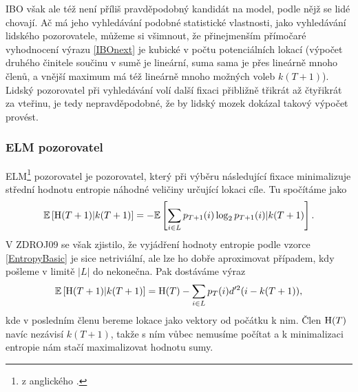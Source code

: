 IBO však ale též není příliš pravděpodobný  kandidát na model, podle nějž se
lidé chovají.  Ač má jeho vyhledávání podobné statistické vlastnosti, jako
vyhledávání lidského pozorovatele, můžeme si všimnout, že přinejmenším
přímočaré vyhodnocení výrazu \eqref{IBOnext} je kubické v počtu potenciálních
lokací (výpočet druhého činitele součinu v sumě je lineární, suma sama je přes
lineárně mnoho členů, a vnější maximum má též lineárně mnoho možných voleb
$k(T+1)$). Lidský pozorovatel při vyhledávání volí další fixaci přibližně
třikrát až čtyřikrát za vteřinu, je tedy nepravděpodobné, že by lidský mozek
dokázal takový výpočet provést. 

\subsubsection{ELM pozorovatel}

ELM\footnote{z anglického .} pozorovatel je
pozorovatel, který při výběru následující fixace minimalizuje střední hodnotu
entropie náhodné veličiny určující lokaci cíle. Tu spočítáme jako
\begin{equation}\label{EntropyBasic}\mathbb{E}\left[\operatorname{H}(T+1)|k(T+1)\right]=-\mathbb{E}\left[\displaystyle\sum_{i\in
L}p_{T+1}(i)\log_2p_{T+1}(i)|k(T+1)\right].\end{equation} V ZDROJ09 se však zjistilo,
že vyjádření hodnoty entropie podle vzorce \eqref{EntropyBasic} je sice
netriviální, ale lze ho dobře aproximovat případem, kdy pošleme v limitě $|L|$
do nekonečna. Pak dostáváme výraz $$ \mathbb{E}\left[\operatorname{H}(T+1)|k(T+1)\right]= \operatorname{H}(T) -
\displaystyle\sum_{i\in L} p_T(i)d'^2(i-k(T+1)),$$ kde v posledním členu bereme
lokace jako vektory od počátku k nim. Člen $\operatorname{H}(T)$ navíc nezávisí $k(T+1)$,
takže s ním vůbec nemusíme počítat a k minimalizaci entropie nám stačí
maximalizovat hodnotu sumy. 

